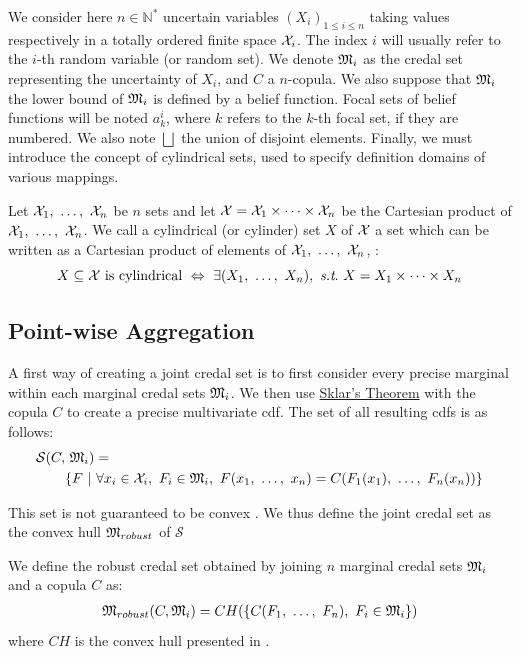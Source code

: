 We consider here $n\in\mathbb{N}^*$ uncertain variables $(X_i)_{1\leqslant i\leqslant n}$ taking values respectively in a totally ordered finite space $\mathcal{X}_i$. The index $i$ will usually refer to the $i$-th random variable (or random set). We denote $\mathfrak{M}_i$ as the credal set representing the uncertainty of $X_i$, and $C$ a $n$-copula. We also suppose that $\mathfrak{M}_i$ the lower bound of $\mathfrak{M}_i$ is defined by a belief function. Focal sets of belief functions will be noted $a^i_k$, where $k$ refers to the $k$-th focal set, if they are numbered. We also note $\bigsqcup$ the union of disjoint elements. Finally, we must introduce the concept of cylindrical sets, used to specify definition domains of various mappings. 
\begin{definition}
    Let $\mathcal{X}_1 , ~\ldots, ~ \mathcal{X}_n$ be $n$ sets and let $\mathcal{X}=\mathcal{X}_1\times\dots\times\mathcal{X}_n$ be the Cartesian product of $\mathcal{X}_1 , ~\ldots, ~ \mathcal{X}_n$. We call a cylindrical (or cylinder) set $X$ of $\mathcal{X}$ a set which can be written as a Cartesian product of elements of $\mathcal{X}_1 , ~\ldots, ~ \mathcal{X}_n$, \ie:
    \begin{equation}
        X\subseteq\X \text{ is cylindrical} ~\Leftrightarrow~ \exists (X_1 \enum X_n),~\st~X=X_1\tdt X_n \label{eq:cylindrical_sets}
    \end{equation}
\end{definition}

\subsection{Point-wise Aggregation}\label{sec:robust_method}
A first way of creating a joint credal set is to first consider every precise marginal within each marginal credal sets $\mathfrak{M}_i$. We then use \hyperref[theorem:sklar]{Sklar's Theorem} with the copula $C$ to create a precise multivariate \acrshort{cdf}. The set of all resulting \acrshort{cdf}s is as follows:
\begin{align}\label{eq:robust_ancestor}
    \mathcal{S}(C,& ~\mathfrak{M}_i) = \nonumber\\
    &\{F~|~\forall x_i \in \mathcal{X}_i,~F_i\in\mathfrak{M}_i, ~ F(x_1 , ~\ldots, ~ x_n) = C(F_1(x_1) , ~\ldots, ~ F_n(x_n))\}
\end{align}

This set is not guaranteed to be convex \cite{schmelzer_random_2023}. We thus define the joint credal set as the convex hull $\mathfrak{M}_{robust}$ of $\mathcal{S}$

\begin{definition}\label{def:robust_credal_set}
    We define the robust credal set obtained by joining $n$ marginal credal sets $\mathfrak{M}_i$ and a copula $C$ as:
    \begin{eqnarray}\label{eq:robust_set}
        \mathfrak{M}_{robust}(C,\mathfrak{M}_i) = CH(\{C(F_1 , ~\ldots, ~ F_n),~F_i\in\mathfrak{M}_i \})
    \end{eqnarray}
    where $CH$ is the convex hull presented in .
\end{definition}

